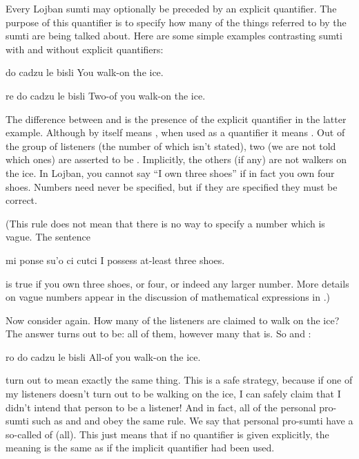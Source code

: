 Every Lojban sumti may optionally be preceded by an explicit
    quantifier. The purpose of this quantifier is to specify how
    many of the things referred to by the sumti are being talked
    about. Here are some simple examples contrasting sumti with and
    without explicit quantifiers:
\begin{example}
do cadzu le bisli\n
You walk-on the ice.
\end{example}

\begin{example}
re do cadzu le bisli\n
Two-of you walk-on the ice.
\end{example}

The difference between  and  is the presence of the explicit
    quantifier  in the latter example. Although  by
    itself means , when used as a quantifier it means
    . Out of the group of listeners (the number of which
    isn't stated), two (we are not told which ones) are asserted to
    be . Implicitly, the others (if any) are
    not walkers on the ice. In Lojban, you cannot say ``I own three
    shoes'' if in fact you own four shoes. Numbers need never be
    specified, but if they are specified they must be correct. 

(This rule does not mean that there is no way to specify a
    number which is vague. The sentence
\begin{example}
mi ponse su'o ci cutci\n
I possess at-least three shoes.
\end{example}

{\noindent}is true if you own three shoes, or four, or indeed any larger
    number. More details on vague numbers appear in the discussion
    of mathematical expressions in .) 

Now consider  again. How many
    of the listeners are claimed to walk on the ice? The answer
    turns out to be: all of them, however many that is. So  and :
\begin{example}
ro do cadzu le bisli\n
All-of you walk-on the ice.
\end{example}

{\noindent}turn out to mean exactly the same thing. This is a safe
    strategy, because if one of my listeners doesn't turn out to be
    walking on the ice, I can safely claim that I didn't intend
    that person to be a listener! And in fact, all of the personal
    pro-sumti such as  and  and  obey the same
    rule. We say that personal pro-sumti have a so-called
     of  (all). This just means that
    if no quantifier is given explicitly, the meaning is the same
    as if the implicit quantifier had been used. 

